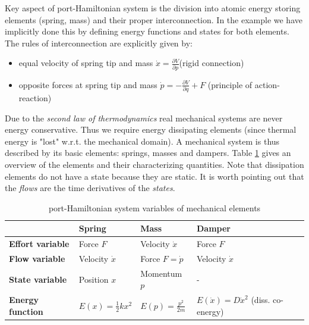 \documentclass[a4paper,twoside, openright,12pt]{report}
\begin{document}
\newline
Key aspect of port-Hamiltonian system is the division into atomic energy storing elements (spring, mass) and their proper interconnection. In the example we have implicitly done this by defining energy functions and states for both elements. The rules of interconnection are explicitly given by: 
\begin{itemize}
\itemsep0em
	\item equal velocity of spring tip and mass $\dot{x}=\frac{\partial V}{\partial p}$(rigid connection)
	\item opposite forces at spring tip and mass $\dot{p}=-\frac{\partial V}{\partial q}+F$ (principle of action-reaction) 
\end{itemize}
Due to the \emph{second law of thermodynamics} real mechanical systems are never energy conservative. Thus we require energy dissipating elements (since thermal energy is "lost" w.r.t. the mechanical domain). A mechanical system is thus described by its basic elements: springs, masses and dampers. Table \ref{TAB:PHSvar_mechanic} gives an overview of the elements and their characterizing quantities. Note that dissipation elements do not have a state because they are static. It is worth pointing out that the \emph{flows} are the time derivatives of the \emph{states}.    



\begin{table}
	\centering
	\caption[port-Hamiltonian system variables of mechanical elements]{port-Hamiltonian system variables of mechanical elements}\vspace{10pt}
	\label{TAB:PHSvar_mechanic}
	
	\begin{tabular}{ l | l | l | l }
		& \textbf{Spring} & \textbf{Mass} & \textbf{Damper} \\ \hline
		\textbf{Effort variable} & Force $F$ & Velocity $\dot{x}$ & Force $ F $ \\ \hline
		\textbf{Flow variable} & Velocity $ \dot{x} $ & Force $ F = \dot{p} $ & Velocity $ \dot{x} $ \\ \hline
		\textbf{State variable} & Position $x$ & Momentum $ p $ & - \\ \hline
		\textbf{Energy function} & $ E(x) = \frac{1}{2}kx^2 $ & $ E(p) = \frac{p^2}{2m} $ & $E(\dot{x}) = D\dot{x}^2  $ (diss. co-energy) \\ 
	\end{tabular}
\end{table}
\end{document}

